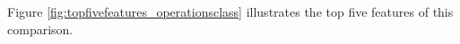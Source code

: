 Figure \ref{fig:topfivefeatures_operationsclass} illustrates the top five features of this comparison.